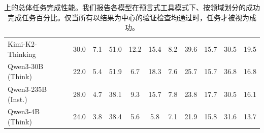 \begin{table}[!h]
{\begin{tabular}{lcccccccccc}
Kimi-K2-Thinking~\citep{kimiteam2025kimik2openagentic} & 30.0 & 7.1 & 51.0 & 12.2 & 15.4 & 8.2 & 39.6 & 15.7 & 30.5 & 19.5 \\
Qwen3-30B (Think)~\citep{qwen3} & 22.0 & 5.4 & {51.9} & 6.7 & 18.3 & 7.6 & 25.7 & 15.7 & 36.8 & 16.8 \\
Qwen3-235B (Inst.)~\citep{qwen3} & 28.0 & 4.7 & 38.1 & 9.3 & 15.7 & 7.8 & 23.8 & 17.7 & 30.5 & 16.1 \\
Qwen3-4B (Think)~\citep{qwen3} & 24.0 & 3.8 & 38.4 & 5.6 & 5.8 & 7.1 & 21.9 & 15.8 & 31.6 & 13.7 \\
\bottomrule
\end{tabular}%
}
\caption{\ours{} 上的总体任务完成性能。我们报告各模型在预言式工具模式下、按领域划分的成功完成任务百分比。仅当所有以结果为中心的验证检查均通过时，任务才被视为成功。}
\label{tab:main_results}
\end{table}
